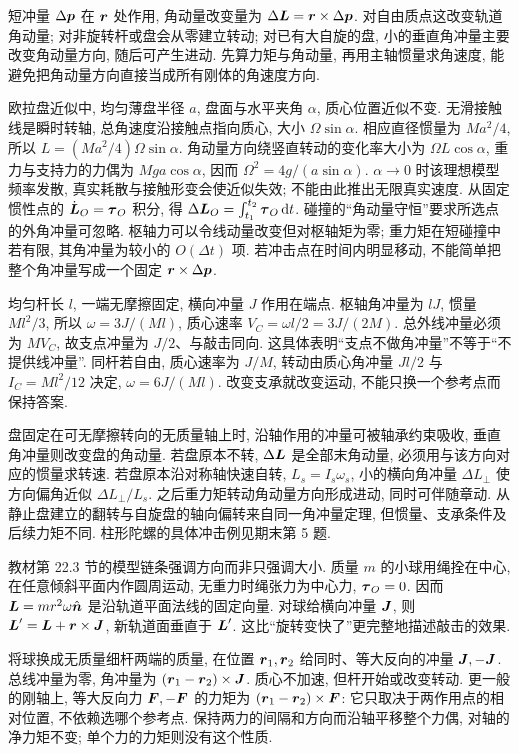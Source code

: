 短冲量 $\Delta\boldsymbol{p}$ 在 $\boldsymbol{r}$ 处作用, 角动量改变量为 $\Delta\boldsymbol{L}=\boldsymbol{r}\times\Delta\boldsymbol{p}$. 对自由质点这改变轨道角动量; 对非旋转杆或盘会从零建立转动; 对已有大自旋的盘, 小的垂直角冲量主要改变角动量方向, 随后可产生进动. 先算力矩与角动量, 再用主轴惯量求角速度, 能避免把角动量方向直接当成所有刚体的角速度方向.

欧拉盘近似中, 均匀薄盘半径 $a$, 盘面与水平夹角 $\alpha$, 质心位置近似不变. 无滑接触线是瞬时转轴, 总角速度沿接触点指向质心, 大小 $\Omega\sin\alpha$. 相应直径惯量为 $Ma^2/4$, 所以 $L=(Ma^2/4)\Omega\sin\alpha$. 角动量方向绕竖直转动的变化率大小为 $\Omega L\cos\alpha$, 重力与支持力的力偶为 $Mga\cos\alpha$, 因而 $\Omega^2=4g/(a\sin\alpha)$. $\alpha\to0$ 时该理想模型频率发散, 真实耗散与接触形变会使近似失效; 不能由此推出无限真实速度.
从固定惯性点的 $\dot{\boldsymbol{L}}_O=\boldsymbol{\tau}_O$ 积分, 得 $\Delta\boldsymbol{L}_O=\int_{t_1}^{t_2}\boldsymbol{\tau}_O\,\mathrm d t$. 碰撞的“角动量守恒”要求所选点的外角冲量可忽略. 枢轴力可以令线动量改变但对枢轴矩为零; 重力矩在短碰撞中若有限, 其角冲量为较小的 $O(\Delta t)$ 项. 若冲击点在时间内明显移动, 不能简单把整个角冲量写成一个固定 $\boldsymbol{r}\times\Delta\boldsymbol{p}$.

均匀杆长 $l$, 一端无摩擦固定, 横向冲量 $J$ 作用在端点. 枢轴角冲量为 $lJ$, 惯量 $Ml^2/3$, 所以 $\omega=3J/(Ml)$, 质心速率 $V_C=\omega l/2=3J/(2M)$. 总外线冲量必须为 $MV_C$, 故支点冲量为 $J/2$、与敲击同向. 这具体表明“支点不做角冲量”不等于“不提供线冲量”. 同杆若自由, 质心速率为 $J/M$, 转动由质心角冲量 $Jl/2$ 与 $I_C=Ml^2/12$ 决定, $\omega=6J/(Ml)$. 改变支承就改变运动, 不能只换一个参考点而保持答案.

盘固定在可无摩擦转向的无质量轴上时, 沿轴作用的冲量可被轴承约束吸收, 垂直角冲量则改变盘的角动量. 若盘原本不转, $\Delta\boldsymbol{L}$ 是全部末角动量, 必须用与该方向对应的惯量求转速. 若盘原本沿对称轴快速自转, $L_s=I_s\omega_s$, 小的横向角冲量 $\Delta L_\perp$ 使方向偏角近似 $\Delta L_\perp/L_s$. 之后重力矩转动角动量方向形成进动, 同时可伴随章动. 从静止盘建立的翻转与自旋盘的轴向偏转来自同一角冲量定理, 但惯量、支承条件及后续力矩不同. 柱形陀螺的具体冲击例见期末第 5 题.

教材第 22.3 节的模型链条强调方向而非只强调大小. 质量 $m$ 的小球用绳拴在中心, 在任意倾斜平面内作圆周运动, 无重力时绳张力为中心力, $\boldsymbol{\tau}_O=0$. 因而 $\boldsymbol{L}=mr^2\omega\hat{\boldsymbol{n}}$ 是沿轨道平面法线的固定向量. 对球给横向冲量 $\boldsymbol{J}$, 则 $\boldsymbol{L}'=\boldsymbol{L}+\boldsymbol{r}\times\boldsymbol{J}$, 新轨道面垂直于 $\boldsymbol{L}'$. 这比“旋转变快了”更完整地描述敲击的效果.

将球换成无质量细杆两端的质量, 在位置 $\boldsymbol{r}_1,\boldsymbol{r}_2$ 给同时、等大反向的冲量 $\boldsymbol{J},-\boldsymbol{J}$. 总线冲量为零, 角冲量为 $(\boldsymbol{r}_1-\boldsymbol{r}_2)\times\boldsymbol{J}$. 质心不加速, 但杆开始或改变转动. 更一般的刚轴上, 等大反向力 $\boldsymbol{F},-\boldsymbol{F}$ 的力矩为 $(\boldsymbol{r}_1-\boldsymbol{r}_2)\times\boldsymbol{F}$: 它只取决于两作用点的相对位置, 不依赖选哪个参考点. 保持两力的间隔和方向而沿轴平移整个力偶, 对轴的净力矩不变; 单个力的力矩则没有这个性质.

